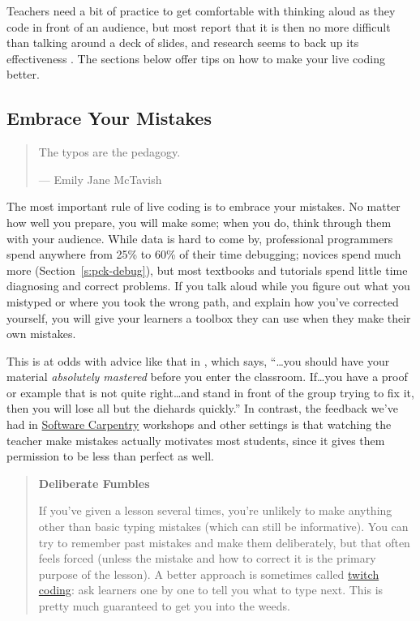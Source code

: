 Teachers need a bit of practice to get comfortable with thinking aloud
as they code in front of an audience, but most report that it is then no
more difficult than talking around a deck of slides, and research seems
to back up its effectiveness \cite{Rubi2013,Haar2017}. The sections
below offer tips on how to make your live coding better.

\subsection{Embrace Your Mistakes}\label{embrace-your-mistakes}

\begin{quote}\setlength{\parindent}{0pt}
The typos are the pedagogy.

--- Emily Jane McTavish
\end{quote}

The most important rule of live coding is to embrace your mistakes. No
matter how well you prepare, you will make some; when you do, think
through them with your audience. While data is hard to come by,
professional programmers spend anywhere from 25\% to 60\% of their time
debugging; novices spend much more (Section~\ref{s:pck-debug}), but most
textbooks and tutorials spend little time diagnosing and correct
problems. If you talk aloud while you figure out what you mistyped or
where you took the wrong path, and explain how you've corrected
yourself, you will give your learners a toolbox they can use when they
make their own mistakes.

This is at odds with advice like that in \cite{Kran2015}, which
says, ``\ldots{}you should have your material \emph{absolutely mastered} before
you enter the classroom. If\ldots{}you have a proof or example that is not
quite right\ldots{}and stand in front of the group trying to fix it, then
you will lose all but the diehards quickly.'' In contrast, the feedback
we've had in \href{http://software-carpentry.org}{Software Carpentry} workshops and other settings is
that watching the teacher make mistakes actually motivates most
students, since it gives them permission to be less than perfect as
well.

\begin{quote}\setlength{\parindent}{0pt}
\textbf{Deliberate Fumbles}

If you've given a lesson several times, you're unlikely to make
anything other than basic typing mistakes (which can still be
informative). You can try to remember past mistakes and make them
deliberately, but that often feels forced (unless the mistake and
how to correct it is the primary purpose of the lesson). A better
approach is sometimes called \protect\hyperlink{g:twitch-coding}{twitch coding}: ask
learners one by one to tell you what to type next. This is pretty
much guaranteed to get you into the weeds.
\end{quote}

